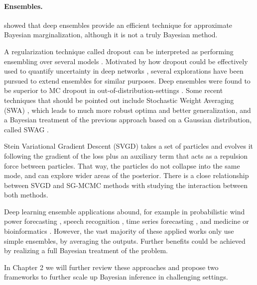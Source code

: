 \fi
\paragraph{Ensembles.} \parencite{bdl} showed that deep ensembles \parencite{ensemble} provide an efficient technique for approximate Bayesian marginalization, although it is not a truly Bayesian method.

A regularization technique called dropout can be interpreted as performing ensembling over several models \parencite{dropout}. Motivated by how dropout could be effectively used to quantify uncertainty in deep networks \parencite{pmlr-v48-gal16}, several explorations have been pursued to extend ensembles for similar purposes. Deep ensembles were found to be superior to MC dropout in out-of-distribution-settings \parencite{Ovadia2019CanYT}.
Some recent techniques that should be pointed out include
Stochastic Weight Averaging (SWA) \parencite{izmailov2018averaging}, which leads to much more robust optima and better generalization, and a Bayesian treatment of the previous approach based on a Gaussian distribution,
called SWAG \parencite{NEURIPS2019_118921ef}.

Stein Variational Gradient Descent (SVGD) \parencite{svgd} takes a set of particles and evolves it following the gradient of the loss plus an auxiliary term that acts as a repulsion force between particles. That
way, the particles do not collapse into the same mode, and can explore wider areas of the posterior. There is a close relationship between SVGD and SG-MCMC methods with \parencite{gallego2018stochastic} 
studying the interaction between both methods.

Deep learning ensemble applications abound, for example in probabilistic wind power forecasting \parencite{wang2017deep}, speech recognition \parencite{deng2014ensemble}, time series forecasting \parencite{qiu2014ensemble}, and medicine or bioinformatics \parencite{qummar2019deep,xiao2018deep,cao2020ensemble}. However, the vast majority of these applied works only use simple ensembles, by averaging the outputs. Further benefits could be achieved by realizing a full Bayesian treatment of the problem.

In Chapter 2 we will further review these approaches and propose two frameworks to further scale up Bayesian inference in challenging settings.


